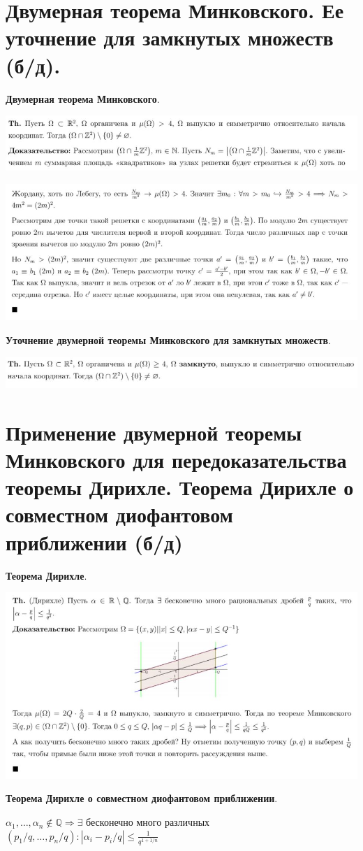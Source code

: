 \setcounter{section}{72}
\section{Двумерная теорема Минковского. Ее уточнение для замкнутых множеств (б/д). }
\textbf{Двумерная теорема Минковского}. \par
\includegraphics[width=14cm]{images/73_1} \par
\includegraphics[width=14cm]{images/73_2} \par
\textbf{Уточнение двумерной теоремы Минковского для замкнутых множеств}. \par
\includegraphics[width=14cm]{images/73_3} \par

\section{Применение двумерной теоремы Минковского для передоказательства теоремы Дирихле. Теорема Дирихле о совместном диофантовом приближении (б/д)}
\textbf{Теорема Дирихле}. \par
\includegraphics[width=14cm]{images/74} \par
\textbf{Теорема Дирихле о совместном диофантовом приближении}. \par
$\alpha_1, \dots, \alpha_n \notin \mathbb{Q} \Rightarrow \exists$ бесконечно много различных $(p_1/q, \dots, p_n/q): |\alpha_i - p_i/q| \leqslant \frac{1}{q^{1+1/n}}$